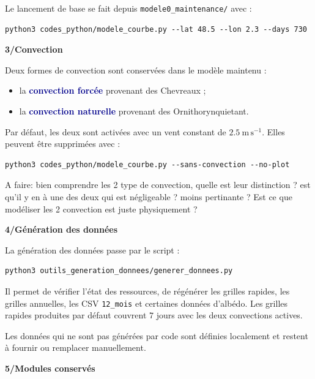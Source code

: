 \documentclass[11pt,a4paper]{article}
\newcommand{\code}[1]{\texttt{#1}}
\newcommand{\motcle}[1]{\textcolor{DarkBlue}{\textbf{#1}}}
\newcommand{\partietitre}[1]{%
    \vspace{1.1em}
    {\Large\bfseries\textcolor{DocRed}{#1}}\par
    \vspace{0.35em}
}
\begin{document}
Le lancement de base se fait depuis \code{modele0\_maintenance/} avec :

\begin{verbatim}
python3 codes_python/modele_courbe.py --lat 48.5 --lon 2.3 --days 730
\end{verbatim}

\partietitre{3/Convection}

Deux formes de convection sont conservées dans le modèle maintenu :

\begin{itemize}
    \item la \motcle{convection forcée} provenant des Chevreaux ;
    \item la \motcle{convection naturelle} provenant des Ornithorynquietant.
\end{itemize}

Par défaut, les deux sont activées avec un vent constant de $2.5\ \mathrm{m\,s^{-1}}$. Elles peuvent être supprimées avec :

\begin{verbatim}
python3 codes_python/modele_courbe.py --sans-convection --no-plot
\end{verbatim}

\textcolor{green!50!black}{A faire: bien comprendre les 2 type de convection, quelle est leur distinction ? est qu'il y en à une des deux qui est négligeable ? moins pertinante ? Est ce que modéliser les 2 convection est juste physiquement ?}

\partietitre{4/Génération des données}

La génération des données passe par le script :

\begin{verbatim}
python3 outils_generation_donnees/generer_donnees.py
\end{verbatim}

Il permet de vérifier l'état des ressources, de régénérer les grilles rapides, les grilles annuelles, les CSV \code{12\_mois} et certaines données d'albédo. Les grilles rapides produites par défaut couvrent $7$ jours avec les deux convections actives.

Les données qui ne sont pas générées par code sont définies localement et restent à fournir ou remplacer manuellement.

\partietitre{5/Modules conservés}
\end{document}
